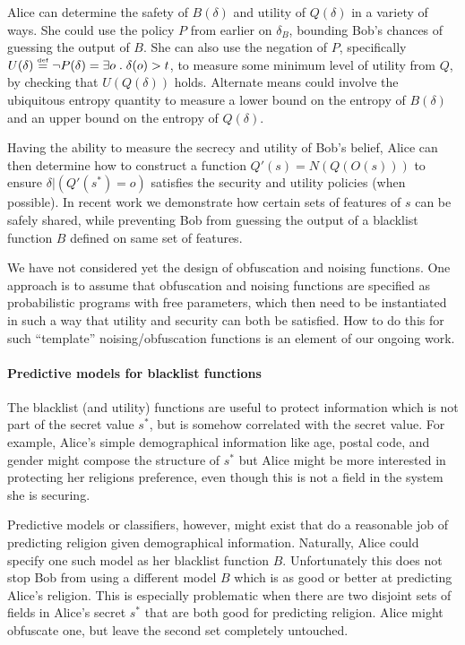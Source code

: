 \documentclass{article} %
\newcommand{\asecret}[0]{s}
\newcommand{\rsecret}[0]{\asecret^*}
\newcommand{\paren}[1]{\left( #1 \right)}
\newcommand{\cond}[0]{|}
\newcommand{\qsep}[0]{\; . \;}
\newcommand{\stacklabel}[1]{\stackrel{\smash{\scriptscriptstyle \mathrm{#1}}}}
\newcommand{\defeq}{\stacklabel{def}=}
\theoremstyle{plain} %
\theoremstyle{definition} %
\begin{document}
Alice can determine the safety of $ B(\delta) $ and utility of $
Q(\delta) $ in a variety of ways. She could use the policy $ P $ from
earlier on $ \delta_B $, bounding Bob's chances of guessing the output
of $ B $. She can also use the negation of $ P $, specifically $
U(\delta) \defeq \neg P(\delta) = \exists o \qsep \delta(o) > t $, to
measure some minimum level of utility from $ Q $, by checking that $
U(Q(\delta)) $ holds. Alternate means could involve the ubiquitous
entropy quantity to measure a lower bound on the entropy of $ B(\delta)
$ and an upper bound on the entropy of $ Q(\delta) $.

Having the ability to measure the secrecy and utility of Bob's belief,
Alice can then determine how to construct a function $ Q'(\asecret) =
N(Q(O(\asecret))) $ to ensure $ \delta \cond \paren{Q'(\rsecret) = o}
$ satisfies the security and utility policies (when possible).  In
recent work \cite{chakraborty12balancing} we demonstrate how certain
sets of features of $ \asecret $ can be safely shared, while
preventing Bob from guessing the output of a blacklist function $ B $
defined on same set of features.

We have not considered yet the design of obfuscation and noising
functions.  One approach is to assume that obfuscation and noising
functions are specified as probabilistic programs with free
parameters, which then need to be instantiated in such a way that
utility and security can both be satisfied. How to do this for such
``template'' noising/obfuscation functions is an element of our
ongoing work.

\paragraph*{Predictive models for blacklist functions} The blacklist
(and utility) functions are useful to protect information which is not
part of the secret value $ \rsecret $, but is somehow correlated with
the secret value. For example, Alice's simple demographical
information like age, postal code, and gender might compose the
structure of $ \rsecret $ but Alice might be more interested in
protecting her religions preference, even though this is not a field
in the system she is securing.

Predictive models or classifiers, however, might exist that do a
reasonable job of predicting religion given demographical
information. Naturally, Alice could specify one such model as her
blacklist function $ B $. Unfortunately this does not stop Bob from
using a different model $ B $ which is as good or better at predicting
Alice's religion. This is especially problematic when there are two
disjoint sets of fields in Alice's secret $ \rsecret $ that are both
good for predicting religion. Alice might obfuscate one, but leave the
second set completely untouched.
\end{document}
